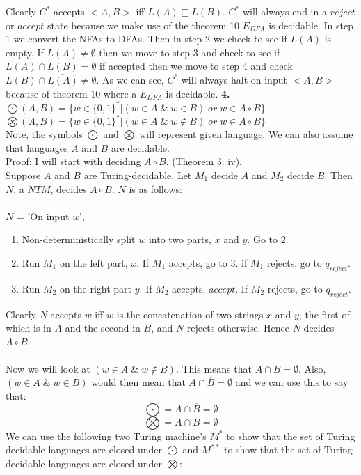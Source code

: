 \documentclass[a4paper,12pt]{article}
\begin{document}
Clearly $C^{*}$ accepts $<A,B>$ iff $L(A) \sqsubseteq L(B)$. $C^{*}$ will always end in a $reject$ or $accept$ state because we make use of the theorem 10 $E_{DFA}$ is decidable. In step 1 we convert the NFAs to DFAs. Then in step 2 we check to see if $L(A)$ is empty. If $L(A) \neq \emptyset$ then we move to step 3 and check to see if $L(A) \cap \overline{L(B)} = \emptyset$ if accepted then we move to step 4 and check $L(B) \cap \overline{L(A)} \neq \emptyset$. As we can see, $C^{*}$ will always halt on input $<A,B>$ because of theorem 10 where a $E_{DFA}$ is decidable.
\newpage
\textbf{4.} \\
$\bigodot (A, B) = \{w \in \{0,1\}^{*} | (w \in A \; \& \; w \in B)\; or \; w \in A  \circ B \}$ \\
$\bigotimes (A, B) = \{w \in \{0,1\}^{*} | (w \in A \; \& \; w \notin B)\; or \; w \in A  \circ B \}$\\
Note, the symbols $\bigodot$ and $\bigotimes$ will represent given language. We can also assume that languages $A$ and $B$ are decidable.\\
Proof: I will start with deciding $A  \circ B$. (Theorem 3. iv).\\
Suppose $A$ and $B$ are Turing-decidable. Let $M_1$ decide $A$ and $M_2$ decide $B$. Then $N$, a $NTM$, decides $A  \circ B$. $N$ is as follows:\\
\\
$N$ = 'On input $w$',
\begin{enumerate}
\item Non-deterministically split $w$ into two parts, $x$ and $y$. Go to 2.
\item Run $M_1$ on the left part, $x$. If $M_1$ accepts, go to 3. if $M_1$ rejects, go to $q_{reject}$.
\item Run $M_2$ on the right part $y$. If $M_2$ accepts, $accept$. If $M_2$ rejects,  go to $q_{reject}$.
\end{enumerate}
Clearly $N$ accepts $w$ iff $w$ is the concatenation of two strings $x$ and $y$, the first of which is in $A$ and the second in $B$, and $N$ rejects otherwise. Hence $N$ decides $A  \circ B$. \\
\\
Now we will look at $(w \in A \; \& \; w \notin B)$. This means that $A \cap B = \emptyset$. Also, $(w \in A \; \& \; w \in B)$ would then mean that $A \cap \overline{B} = \emptyset$ and we can use this to say that: $$\bigodot = A \cap \overline{B} = \emptyset$$
$$\bigotimes = A \cap B = \emptyset$$
We can use the following two Turing machine's $M^{*}$ to show that the set of Turing decidable languages are closed under $\bigodot$ and $M^{**}$ to show that the set of Turing decidable languages are closed under $\bigotimes$:
\end{document}
